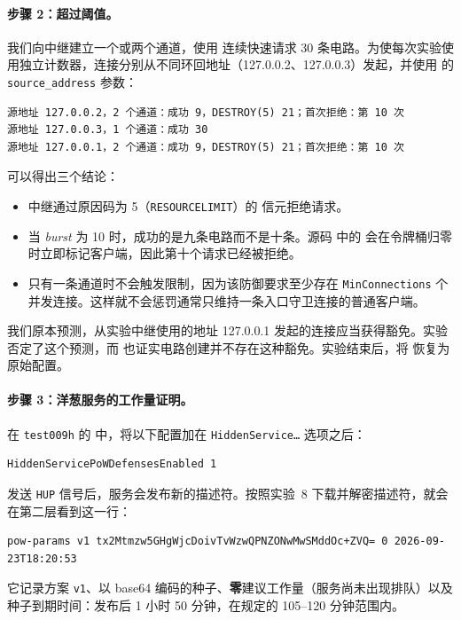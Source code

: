 \paragraph{步骤 2：超过阈值。}我们向中继建立一个或两个通道，使用  连续快速请求 30 条电路。为使每次实验使用独立计数器，连接分别从不同环回地址（127.0.0.2、127.0.0.3）发起，并使用  的 \texttt{source\_address} 参数：
\begin{lstlisting}[numbers=none]
源地址 127.0.0.2，2 个通道：成功 9，DESTROY(5) 21；首次拒绝：第 10 次
源地址 127.0.0.3，1 个通道：成功 30
源地址 127.0.0.1，2 个通道：成功 9，DESTROY(5) 21；首次拒绝：第 10 次
\end{lstlisting}
可以得出三个结论：
\begin{itemize}
  \item 中继通过原因码为 5（\texttt{RESOURCELIMIT}）的  信元拒绝请求。
  \item 当 \emph{burst} 为 10 时，成功的是九条电路而不是十条。源码  中的  会在令牌桶归零时立即标记客户端，因此第十个请求已经被拒绝。
  \item 只有一条通道时不会触发限制，因为该防御要求至少存在 \texttt{MinConnections} 个并发连接。这样就不会惩罚通常只维持一条入口守卫连接的普通客户端。
\end{itemize}
我们原本预测，从实验中继使用的地址 127.0.0.1 发起的连接应当获得豁免。实验否定了这个预测，而  也证实电路创建并不存在这种豁免。实验结束后，将  恢复为原始配置。

\paragraph{步骤 3：洋葱服务的工作量证明。}在 \texttt{test009h} 的  中，将以下配置加在 \texttt{HiddenService\ldots} 选项之后：
\begin{lstlisting}[language=torrc,numbers=none]
HiddenServicePoWDefensesEnabled 1
\end{lstlisting}
发送 \texttt{HUP} 信号后，服务会发布新的描述符。按照实验~8 下载并解密描述符，就会在第二层看到这一行：
\begin{lstlisting}[numbers=none]
pow-params v1 tx2Mtmzw5GHgWjcDoivTvWzwQPNZONwMwSMddOc+ZVQ= 0 2026-09-23T18:20:53
\end{lstlisting}
它记录方案 \texttt{v1}、以 base64 编码的种子、\textbf{零}建议工作量（服务尚未出现排队）以及种子到期时间：发布后 1 小时 50 分钟，在规定的 105--120 分钟范围内。

